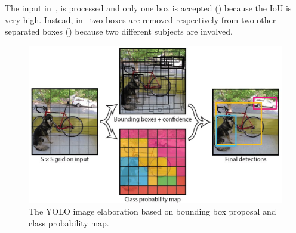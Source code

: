 The input in~, is processed and only one box is accepted () because the IoU is very high. Instead, in~ two boxes are removed respectively from two other separated boxes () because two different subjects are involved.

\begin{figure}[!h]
	\centering
	\includegraphics[width=0.8\linewidth]{images/howItWorks_yolo}
	\caption{The YOLO image elaboration based on bounding box proposal and class probability map.}
	\label{fig:howItWorks_yolo}
\end{figure}

